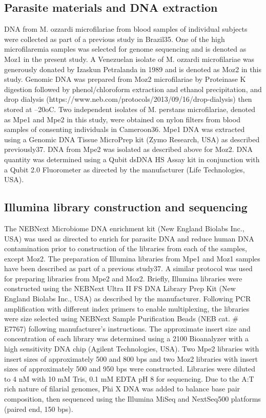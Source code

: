 \documentclass[10pt, a4paper, twocolumn]{article} %
\begin{document}
\subsection{Parasite materials and DNA extraction}
DNA from M. ozzardi microfilariae from blood samples of individual subjects were collected as part of a previous study in Brazil35. One of the high microfilaremia samples was selected for genome sequencing and is denoted as Moz1 in the present study. A Venezuelan isolate of M. ozzardi microfilariae was generously donated by Izaskun Petralanda in 1989 and is denoted as Moz2 in this study. Genomic DNA was prepared from Moz2 microfilariae by Proteinase K digestion followed by phenol/chloroform extraction and ethanol precipitation, and drop dialysis (https://www.neb.com/protocols/2013/09/16/drop-dialysis) then stored at –20oC. Two independent isolates of M. perstans microfilariae, denoted as Mpe1 and Mpe2 in this study, were obtained on nylon filters from blood samples of consenting individuals in Cameroon36. Mpe1 DNA was extracted using a Genomic DNA Tissue MicroPrep kit (Zymo Research, USA) as described previously37. DNA from Mpe2 was isolated as described above for Moz2. DNA quantity was determined using a Qubit dsDNA HS Assay kit in conjunction with a Qubit 2.0 Fluorometer as directed by the manufacturer (Life Technologies, USA).

\subsection{Illumina library construction and sequencing}
The NEBNext Microbiome DNA enrichment kit (New England Biolabs Inc., USA) was used as directed to enrich for parasite DNA and reduce human DNA contamination prior to construction of the libraries from each of the samples, except Moz2. The preparation of Illumina libraries from Mpe1 and Moz1 samples have been described as part of a previous study37. A similar protocol was used for preparing libraries from Mpe2 and Moz2. Briefly, Illumina libraries were constructed using the NEBNext Ultra II FS DNA Library Prep Kit (New England Biolabs Inc., USA) as described by the manufacturer. Following PCR amplification with different index primers to enable multiplexing, the libraries were size selected using NEBNext Sample Purification Beads (NEB cat. # E7767) following manufacturer’s instructions. The approximate insert size and concentration of each library was determined using a 2100 Bioanalyzer with a high sensitivity DNA chip (Agilent Technologies, USA). Two Mpe2 libraries with insert sizes of approximately 500 and 800 bps and two Moz2 libraries with insert sizes of approximately 500 and 950 bps were constructed. Libraries were diluted to 4 nM with 10 mM Tris, 0.1 mM EDTA pH 8 for sequencing. Due to the A:T rich nature of filarial genomes, Phi X DNA was added to balance base pair composition, then sequenced using the Illumina MiSeq and NextSeq500 platforms (paired end, 150 bps). 
\end{document}
